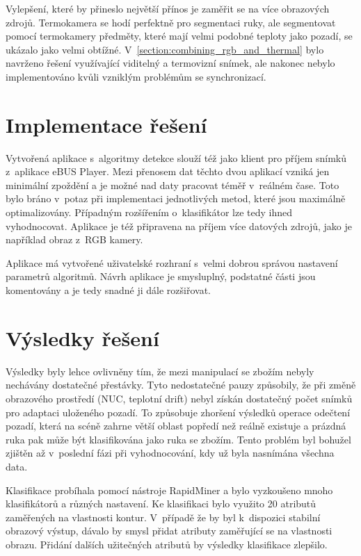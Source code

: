 Vylepšení, které by přineslo největší přínos je zaměřit se na více obrazových zdrojů. Termokamera se hodí perfektně pro segmentaci ruky, ale segmentovat pomocí termokamery předměty, které mají velmi podobné teploty jako pozadí, se ukázalo jako velmi obtížné. V~\ref{section:combining_rgb_and_thermal} bylo navrženo řešení využívající viditelný a termovizní snímek, ale nakonec nebylo implementováno kvůli vzniklým problémům se synchronizací.

\section{Implementace řešení}
Vytvořená aplikace s~algoritmy detekce slouží též jako klient pro příjem snímků z~aplikace eBUS Player. Mezi přenosem dat těchto dvou aplikací vzniká jen minimální zpoždění a je možné nad daty pracovat téměř v~reálném čase. Toto bylo bráno v~potaz při implementaci jednotlivých metod, které jsou maximálně optimalizovány. Případným rozšířením o~klasifikátor lze tedy ihned vyhodnocovat. Aplikace je též připravena na příjem více datových zdrojů, jako je například obraz z~RGB kamery.

Aplikace má vytvořené uživatelské rozhraní s~velmi dobrou správou nastavení parametrů algoritmů. Návrh aplikace je smysluplný, podstatné části jsou komentovány a je tedy snadné ji dále rozšiřovat.

\section{Výsledky řešení}
Výsledky byly lehce ovlivněny tím, že mezi manipulací se zbožím nebyly nechávány dostatečné přestávky. Tyto nedostatečné pauzy způsobily, že při změně obrazového prostředí (NUC, teplotní drift) nebyl získán dostatečný počet snímků pro adaptaci uloženého pozadí. To způsobuje zhoršení výsledků operace odečtení pozadí, která na scéně zahrne větší oblast popředí než reálně existuje a prázdná ruka pak může být klasifikována jako ruka se zbožím. Tento problém byl bohužel zjištěn až v~poslední fázi při vyhodnocování, kdy už byla nasnímána všechna data.

Klasifikace probíhala pomocí nástroje RapidMiner a bylo vyzkoušeno mnoho klasifikátorů a různých nastavení. Ke klasifikaci bylo využito 20 atributů zaměřených na vlastnosti kontur. V~případě že by byl k~dispozici stabilní obrazový výstup, dávalo by smysl přidat atributy zaměřující se na vlastnosti obrazu. Přidání dalších užitečných atributů by výsledky klasifikace zlepšilo. 

